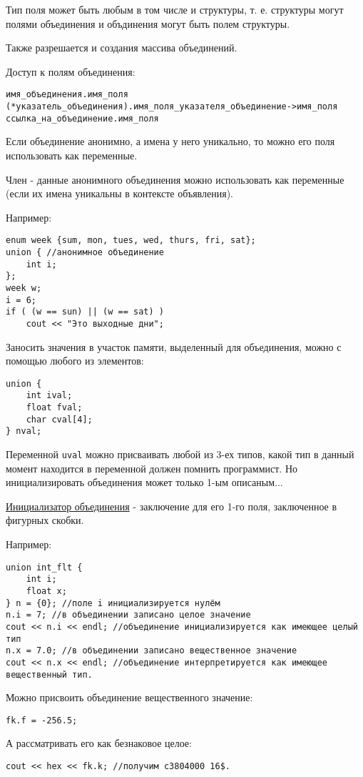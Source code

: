 Тип поля может быть любым в том числе и структуры, т. е. структуры могут полями объединения и объдинения могут быть полем структуры.

Также разрешается и создания массива объединений.

Доступ к полям объединения:

\begin{verbatim}
имя_объединения.имя_поля
(*указатель_объединения).имя_поля_указателя_объединение->имя_поля
ссылка_на_объединение.имя_поля
\end{verbatim}

Если объединение анонимно, а имена у него уникально, то можно его поля использовать как переменные.

Член - данные анонимного объединения можно использовать как переменные (если их имена уникальны в контексте объявления).

Например:

\begin{verbatim}
enum week {sum, mon, tues, wed, thurs, fri, sat};
union { //анонимное объединение
    int i;
};
week w;
i = 6;
if ( (w == sun) || (w == sat) )
    cout << "Это выходные дни";
\end{verbatim}

Заносить значения в участок памяти, выделенный для объединения, можно с помощью любого из элементов:

\begin{verbatim}
union {
    int ival;
    float fval;
    char cval[4];
} nval;
\end{verbatim}

Переменной \texttt{uval} можно присваивать любой из 3-ех типов, какой тип в данный момент находится в переменной должен помнить программист. Но инициализировать объединения может только 1-ым описаным...

\underline{Инициализатор объединения} - заключение для его 1-го поля, заключенное в фигурных скобки.

Например:

\begin{verbatim}
union int_flt {
    int i;
    float x;
} n = {0}; //поле i инициализируется нулём
n.i = 7; //в объединении записано целое значение
cout << n.i << endl; //объединение инициализируется как имеющее целый тип
n.x = 7.0; //в объединении записано вещественное значение
cout << n.x << endl; //объединение интерпретируется как имеющее вещественный тип.
\end{verbatim}

Можно присвоить объединение вещественного значение:

\begin{verbatim}
fk.f = -256.5;
\end{verbatim}

А рассматривать его как безнаковое целое:

\begin{verbatim}
cout << hex << fk.k; //получим с3804000 16$.
\end{verbatim}